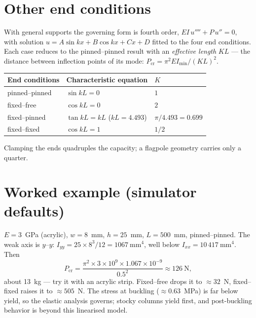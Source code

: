 \documentclass[10pt,a4paper]{article}
\begin{document}
\section*{Other end conditions}
With general supports the governing form is fourth order,
$EI\,u'''' + P\,u'' = 0$, with solution $u = A\sin kx + B\cos kx + Cx + D$
fitted to the four end conditions. Each case reduces to the pinned--pinned
result with an \emph{effective length} $KL$ --- the distance between inflection
points of its mode: $P_{\mathrm{cr}} = \pi^2 E I_{\min} / (K L)^2$.
\begin{center}
\begin{tabular}{lll}
\toprule
End conditions & Characteristic equation & $K$ \\
\midrule
pinned--pinned & $\sin kL = 0$            & $1$ \\
fixed--free    & $\cos kL = 0$            & $2$ \\
fixed--pinned  & $\tan kL = kL$ \;($kL = 4.493$) & $\pi/4.493 = 0.699$ \\
fixed--fixed   & $\cos kL = 1$            & $1/2$ \\
\bottomrule
\end{tabular}
\end{center}
Clamping the ends quadruples the capacity; a flagpole geometry carries only a quarter.

\section*{Worked example (simulator defaults)}
$E = 3$~GPa (acrylic), $w = 8$~mm, $h = 25$~mm, $L = 500$~mm, pinned--pinned.
The weak axis is $y$--$y$: $I_{yy} = 25 \times 8^3 / 12 = 1067~\text{mm}^4$, well
below $I_{xx} = 10\,417~\text{mm}^4$. Then
\begin{equation}
P_{\mathrm{cr}} = \frac{\pi^2 \times 3\times10^{9} \times 1.067\times10^{-9}}{0.5^2}
\approx 126~\text{N},
\end{equation}
about 13~kg --- try it with an acrylic strip. Fixed--free drops it to
$\approx 32$~N, fixed--fixed raises it to $\approx 505$~N. The stress at
buckling ($\approx 0.63$~MPa) is far below yield, so the elastic analysis
governs; stocky columns yield first, and post-buckling behavior is beyond
this linearised model.
\end{document}
